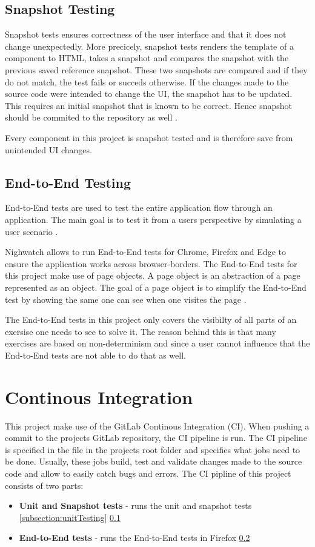 \subsection{Snapshot Testing}
\label{subsection:snapshotTesting}
Snapshot tests ensures correctness of the user interface and that it does not change unexpectedly. More precicely, snapshot tests renders the template of a component to HTML, takes a snapshot and compares the snapshot with the previous saved reference snapshot. These two snapshots are compared and if they do not match, the test fails or succeds otherwise. If the changes made to the source code were intended to change the UI, the snapshot has to be updated. This requires an initial snapshot that is known to be correct. Hence snapshot should be commited to the repository as well \cite{Jest}.

Every component in this project is snapshot tested and is therefore save from unintended UI changes.

\subsection{End-to-End Testing}
\label{subsection:e2e}
End-to-End tests are used to test the entire application flow through an application. The main goal is to test it from a users perspective by simulating a user scenario \cite{EndToEndTests}. 

Nighwatch allows to run End-to-End tests for Chrome, Firefox and Edge to ensure the application works across browser-borders. The End-to-End tests for this project make use of page objects. A page object is an abstraction of a page represented as an object. The goal of a page object is to simplify the End-to-End test by showing the same one can see when one visites the page \cite{Nightwatch}.

The End-to-End tests in this project only covers the visibilty of all parts of an exersise one needs to see to solve it. The reason behind this is that many exercises are based on non-determinism and since a user cannot influence that the End-to-End tests are not able to do that as well.

\section{Continous Integration}
\label{section:CI}

This project make use of the GitLab Continous Integration (CI). When pushing a commit to the projects GitLab repository, the CI pipeline is run. The CI pipeline is specified in the  file in the projects root folder and specifies what jobs need to be done. Usually, these jobs build, test and validate changes made to the source code and allow to easily catch bugs and errors.
The CI pipline of this project consists of two parts:

\begin{itemize}
    \item \textbf{Unit and Snapshot tests} - runs the unit and snapshot tests \ref{subsection:unitTesting} \ref{subsection:snapshotTesting}
    \item \textbf{End-to-End tests} - runs the End-to-End tests in Firefox \ref{subsection:e2e}
\end{itemize}
